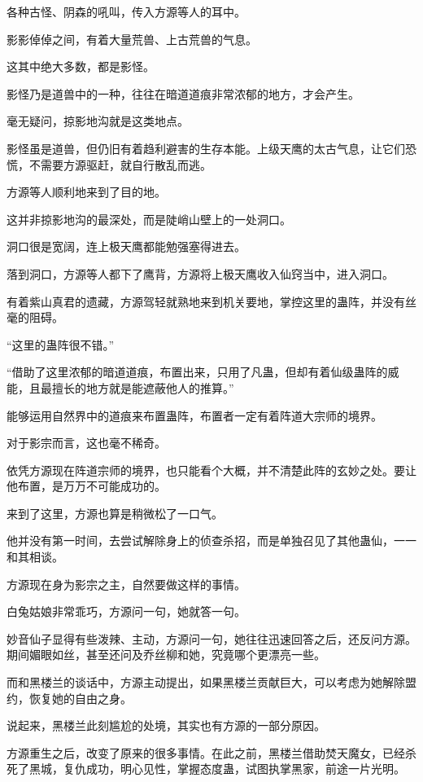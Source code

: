 \begin{this_body}
各种古怪、阴森的吼叫，传入方源等人的耳中。

影影倬倬之间，有着大量荒兽、上古荒兽的气息。

这其中绝大多数，都是影怪。

影怪乃是道兽中的一种，往往在暗道道痕非常浓郁的地方，才会产生。

毫无疑问，掠影地沟就是这类地点。

影怪虽是道兽，但仍旧有着趋利避害的生存本能。上级天鹰的太古气息，让它们恐慌，不需要方源驱赶，就自行散乱而逃。

方源等人顺利地来到了目的地。

这并非掠影地沟的最深处，而是陡峭山壁上的一处洞口。

洞口很是宽阔，连上极天鹰都能勉强塞得进去。

落到洞口，方源等人都下了鹰背，方源将上极天鹰收入仙窍当中，进入洞口。

有着紫山真君的遗藏，方源驾轻就熟地来到机关要地，掌控这里的蛊阵，并没有丝毫的阻碍。

“这里的蛊阵很不错。”

“借助了这里浓郁的暗道道痕，布置出来，只用了凡蛊，但却有着仙级蛊阵的威能，且最擅长的地方就是能遮蔽他人的推算。”

能够运用自然界中的道痕来布置蛊阵，布置者一定有着阵道大宗师的境界。

对于影宗而言，这也毫不稀奇。

依凭方源现在阵道宗师的境界，也只能看个大概，并不清楚此阵的玄妙之处。要让他布置，是万万不可能成功的。

来到了这里，方源也算是稍微松了一口气。

他并没有第一时间，去尝试解除身上的侦查杀招，而是单独召见了其他蛊仙，一一和其相谈。

方源现在身为影宗之主，自然要做这样的事情。

白兔姑娘非常乖巧，方源问一句，她就答一句。

妙音仙子显得有些泼辣、主动，方源问一句，她往往迅速回答之后，还反问方源。期间媚眼如丝，甚至还问及乔丝柳和她，究竟哪个更漂亮一些。

而和黑楼兰的谈话中，方源主动提出，如果黑楼兰贡献巨大，可以考虑为她解除盟约，恢复她的自由之身。

说起来，黑楼兰此刻尴尬的处境，其实也有方源的一部分原因。

方源重生之后，改变了原来的很多事情。在此之前，黑楼兰借助焚天魔女，已经杀死了黑城，复仇成功，明心见性，掌握态度蛊，试图执掌黑家，前途一片光明。


\end{this_body}
